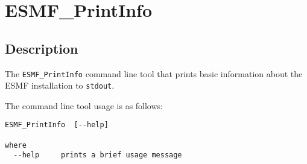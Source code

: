 
\section{ESMF\_PrintInfo}
\label{sec:ESMF_PrintInfo}

\subsection{Description}

The {\tt ESMF\_PrintInfo} command line tool that prints basic information about the
ESMF installation to {\tt stdout}.

The command line tool usage is as follows:

\begin{verbatim}
ESMF_PrintInfo  [--help]

where
  --help     prints a brief usage message
  
\end{verbatim}
